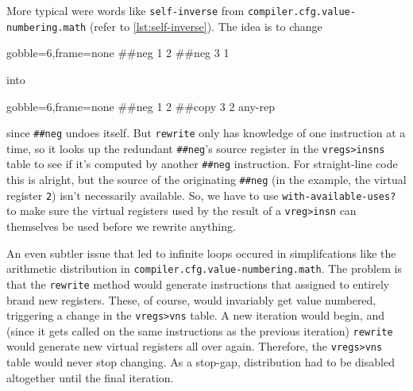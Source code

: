 \begin{sloppypar}
More typical were words like \Verb|self-inverse| from
\Verb|compiler.cfg.value-numbering.math| (refer to \vref{lst:self-inverse}).
The idea is to change
%
\begin{center}
  \begin{minipage}{0.2\linewidth}
    \begin{factorcode*}{gobble=6,frame=none}
      ##neg 1 2
      ##neg 3 1
    \end{factorcode*}
  \end{minipage}
\end{center}
%
\noindent into
%
\begin{center}
  \begin{minipage}{0.2\linewidth}
    \begin{factorcode*}{gobble=6,frame=none}
      ##neg 1 2
      ##copy 3 2 any-rep
    \end{factorcode*}
  \end{minipage}
\end{center}
%
\noindent since \Verb|##neg| undoes itself.  But \Verb|rewrite| only has
knowledge of one instruction at a time, so it looks up the redundant
\Verb|##neg|'s source register in the \Verb|vregs>insns| table to see if
it's computed by another \Verb|##neg| instruction.  For straight-line code this
is alright, but the source of the originating \Verb|##neg| (in the example, the
virtual register \Verb|2|) isn't necessarily available.  So, we have to use
\Verb|with-available-uses?| to make sure the virtual registers used by the
result of a \Verb|vreg>insn| can themselves be used before we rewrite
anything.
\end{sloppypar}

An even subtler issue that led to infinite loops occured in simplifcations like
the arithmetic distribution in \Verb|compiler.cfg.value-numbering.math|.  The
problem is that the \Verb|rewrite| method would generate instructions that
assigned to entirely brand new registers.  These, of course, would invariably
get value numbered, triggering a change in the \Verb|vregs>vns| table.  A new
iteration would begin, and (since it gets called on the same instructions as
the previous iteration) \Verb|rewrite| would generate new virtual registers
all over again.  Therefore, the \Verb|vregs>vns| table would never stop
changing.  As a stop-gap, distribution had to be disabled altogether until the
final iteration.


